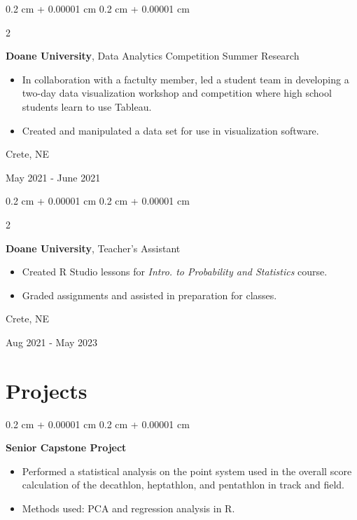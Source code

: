 \documentclass[10pt, letterpaper]{article}
\newenvironment{highlights}{
    \begin{itemize}[
        topsep=0.10 cm,
        parsep=0.10 cm,
        partopsep=0pt,
        itemsep=0pt,
        leftmargin=0.4 cm + 10pt
    ]
}{
    \end{itemize}
} %
\newenvironment{onecolentry}{
    \begin{adjustwidth}{
        0.2 cm + 0.00001 cm
    }{
        0.2 cm + 0.00001 cm
    }
}{
    \end{adjustwidth}
} %
\newenvironment{twocolentry}[2][]{
    \onecolentry
    \def\secondColumn{#2}
    \setcolumnwidth{\fill, 4.5 cm}
    \begin{paracol}{2}
}{
    \switchcolumn \raggedleft \secondColumn
    \end{paracol}
    \endonecolentry
} %
\begin{document}
        \vspace{0.2 cm}

        \begin{twocolentry}{
            Crete, NE

        May 2021 - June 2021
        }
            \textbf{Doane University}, Data Analytics Competition Summer Research
            \begin{highlights}
                \item In collaboration with a factulty member, led a student team in developing a two-day data visualization workshop and competition where high school students learn to use Tableau.
                \item Created and manipulated a data set for use in visualization software.
            \end{highlights}
        \end{twocolentry}

         \vspace{0.2 cm}

        \begin{twocolentry}{
            Crete, NE
            
        Aug 2021 - May 2023
        }
            \textbf{Doane University}, Teacher's Assistant
            \begin{highlights}
                \item Created R Studio lessons for \textit{Intro. to Probability and Statistics} course.
                \item Graded assignments and assisted in preparation for classes.
            \end{highlights}
        \end{twocolentry}


    
    \section{Projects}

        
        \begin{onecolentry}{
            
        }
            \textbf{Senior Capstone Project}
            \begin{highlights}
                \item Performed a statistical analysis on the point system used in the overall score calculation of the decathlon, heptathlon, and pentathlon in track and field.
                \item Methods used: PCA and regression analysis in R.
            \end{highlights}
        \end{onecolentry}
\end{document}
